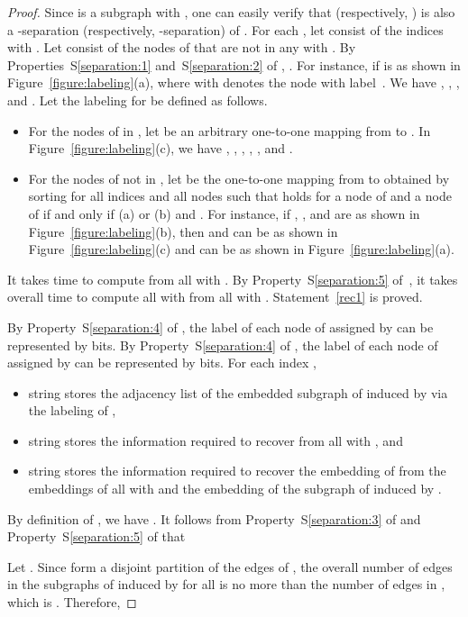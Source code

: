 \documentclass[12pt]{article}
\begin{document}
\begin{proof}
Since  is a subgraph  with , one can
easily verify that  (respectively, ) is also a
-separation (respectively, -separation) of .
For each , let  consist of the indices  with
. Let  consist of the nodes of  that
are not in any  with . By
Properties~S\ref{separation:1} and~S\ref{separation:2} of ,
.  For instance, if  is as shown in
Figure~\ref{figure:labeling}(a), where  with 
denotes the node with label~.  We have
, , , and
.  Let the labeling  for 
be defined as follows.
\begin{itemize}
\addtolength{\itemsep}{-0.5\baselineskip}
\item 
For the nodes of  in , let  be an arbitrary
one-to-one mapping from  to . In
Figure~\ref{figure:labeling}(c), we have ,
, , ,
, and .

\item 
For the nodes of  not in , let  be the
one-to-one mapping from  to  obtained by sorting  for all
indices  and all nodes  such that
 holds for a node  of  and a node
 of  if and only if (a)  or (b)  and
.  For instance, if , , and
 are as shown in Figure~\ref{figure:labeling}(b), then
 and  can be as shown in
Figure~\ref{figure:labeling}(c) and  can be as shown in
Figure~\ref{figure:labeling}(a).
\end{itemize}
It takes  time to compute
 from all  with . By
Property~S\ref{separation:5} of~, it takes overall 
time to compute all  with  from all
 with .
Statement~\ref{rec1} is proved.

By Property~S\ref{separation:4} of , the label of each
node of  assigned by  can be represented by
 bits.
By Property~S\ref{separation:4} of , the label of each node
of  assigned by  can be represented by
 bits.
For each index , 
\begin{itemize}
\addtolength{\itemsep}{-0.5\baselineskip}
\item 
string  stores the adjacency list of the
embedded subgraph of  induced by  via the labeling
 of ,
\item 
string  stores the information required to
recover  from all  with , and
\item 
string  stores the information required to
recover the embedding of  from the embeddings of all 
with  and the embedding of the subgraph of  induced
by .
\end{itemize}
By definition of , we have . It
follows from Property~S\ref{separation:3} of  and
Property~S\ref{separation:5} of  that 

Let .  Since  form
a disjoint partition of the edges of , the overall number of edges
in the subgraphs of  induced by  for all 
is no more than the number of edges in , which is
.  Therefore,


\end{proof}
\end{document}
